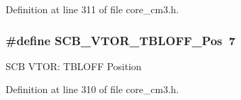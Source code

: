 \-Definition at line 311 of file core\-\_\-cm3.\-h.

\hypertarget{group___c_m_s_i_s___s_c_b_gac6a55451ddd38bffcff5a211d29cea78}{
\subsubsection[{\-S\-C\-B\-\_\-\-V\-T\-O\-R\-\_\-\-T\-B\-L\-O\-F\-F\-\_\-\-Pos}]{\setlength{\rightskip}{0pt plus 5cm}\#define {\bf \-S\-C\-B\-\_\-\-V\-T\-O\-R\-\_\-\-T\-B\-L\-O\-F\-F\-\_\-\-Pos}~7}}\label{group___c_m_s_i_s___s_c_b_gac6a55451ddd38bffcff5a211d29cea78}
\-S\-C\-B \-V\-T\-O\-R\-: \-T\-B\-L\-O\-F\-F \-Position 

\-Definition at line 310 of file core\-\_\-cm3.\-h.

